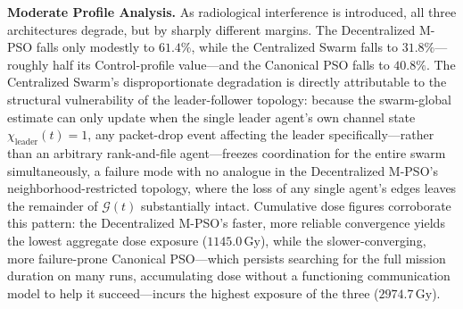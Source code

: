 \documentclass[journal]{IEEEtran}
\begin{document}
\textbf{Moderate Profile Analysis.} As radiological interference is introduced, all three architectures degrade, but by sharply different margins. The Decentralized M-PSO falls only modestly to $61.4\%$, while the Centralized Swarm falls to $31.8\%$---roughly half its Control-profile value---and the Canonical PSO falls to $40.8\%$. The Centralized Swarm's disproportionate degradation is directly attributable to the structural vulnerability of the leader-follower topology: because the swarm-global estimate can only update when the single leader agent's own channel state $\chi_{\text{leader}}(t)=1$, any packet-drop event affecting the leader specifically---rather than an arbitrary rank-and-file agent---freezes coordination for the entire swarm simultaneously, a failure mode with no analogue in the Decentralized M-PSO's neighborhood-restricted topology, where the loss of any single agent's edges leaves the remainder of $\mathcal{G}(t)$ substantially intact. Cumulative dose figures corroborate this pattern: the Decentralized M-PSO's faster, more reliable convergence yields the lowest aggregate dose exposure ($1145.0\,\text{Gy}$), while the slower-converging, more failure-prone Canonical PSO---which persists searching for the full mission duration on many runs, accumulating dose without a functioning communication model to help it succeed---incurs the highest exposure of the three ($2974.7\,\text{Gy}$).
\end{document}
